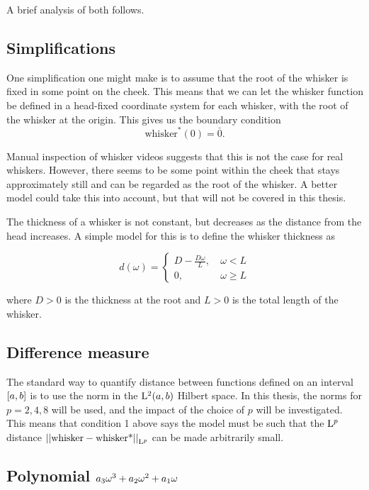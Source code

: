A brief analysis of both follows.

\subsection{Simplifications}
One simplification one might make is to assume that the root of the
whisker is fixed in some point on the cheek. This means that we can
let the whisker function be defined in a head-fixed coordinate system
for each whisker, with the root of the whisker at the origin. This
gives us the boundary condition
\begin{equation}
    \label{eq:bv_root}
    \text{whisker}^*(0)=\bar{0}.
\end{equation}

Manual inspection of whisker videos suggests that this is not the case
for real whiskers. However, there seems to be some point within the
cheek that stays approximately still and can be regarded as the root
of the whisker. A better model could take this into account, but that
will not be covered in this thesis.

The thickness of a whisker is not constant, but decreases as the
distance from the head increases. A simple model for this is to define
the whisker thickness as

\begin{equation}
    d(\omega) = \begin{cases}
        D-\frac{D\omega}{L},~& \omega<L\\
        0,~& \omega\ge L
    \end{cases}
\end{equation}

where $D>0$ is the thickness at the root and $L>0$ is the total length of the
whisker.

\subsection{Difference measure}
    The standard way to quantify distance between functions defined on an
    interval $\interval{a}{b}$ is to use the norm in the $\Lp[2](a, b)$
    Hilbert space. In this thesis, the norms for $p = 2, 4, 8$ will be
    used, and the impact of the choice of $p$ will be investigated. This
    means that condition 1 above says the model must be such that the
    $\Lp$ distance $\Lpnorm{\text{whisker} - \text{whisker*}}$ can be made
    arbitrarily small.

\subsection{Polynomial $\Spline{\omega}$}

